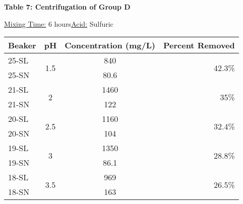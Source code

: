 \begin{center}
\begin{minipage}{.5\textwidth}
        \end{minipage}
        \newpage
        \renewcommand\arraystretch{1.5}
        {\large{\bf Table 7: Centrifugation of Group D\\}}
        \vspace{2 mm}
        \underline{Mixing Time:} 6 hours\hspace{5mm}\underline{Acid:} Sulfuric\\
        \vspace{2 mm}
        \begin{tabular}{|l c c r|}
            \hline
            \textbf{Beaker} & \textbf{pH} & \textbf{Concentration (mg/L)} & \textbf{Percent Removed} \\ \hline
            25-SL & \multirow{2}{*}{1.5} & 840  & \multirow{2}{*}{42.3\%} \\
            25-SN & & 80.6 & \\\hline
            21-SL & \multirow{2}{*}{2}   & 1460 & \multirow{2}{*}{35\%}   \\
            21-SN & & 122  &   \\\hline
            20-SL & \multirow{2}{*}{2.5} & 1160 & \multirow{2}{*}{32.4\%} \\
            20-SN & & 104  & \\\hline
            19-SL & \multirow{2}{*}{3}   & 1350 & \multirow{2}{*}{28.8\%} \\
            19-SN & & 86.1 & \\\hline
            18-SL & \multirow{2}{*}{3.5} & 969  & \multirow{2}{*}{26.5\%} \\
            18-SN & & 163  & \\\hline
        \end{tabular}
        \begin{minipage}{.5\textwidth}
            \vspace{30mm}
\end{minipage}
\end{center}
